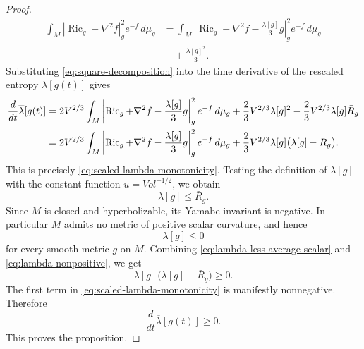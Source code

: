\documentclass{amsart}
\begin{document}
\begin{proof}
\begin{equation}
\label{eq:square-decomposition}
\begin{aligned}
        \int_M
        \left|
                \operatorname{Ric}_g+\nabla^2 f
        \right|_g^2
        e^{-f}\,d\mu_g
        &=
        \int_M
        \left|
                \operatorname{Ric}_g+\nabla^2 f
                -
                \frac{\lambda[g]}{3}g
        \right|_g^2
        e^{-f}\,d\mu_g        \\
        &\quad
        +
        \frac{\lambda[g]^2}{3}.
\end{aligned}
\end{equation}
Substituting \eqref{eq:square-decomposition} into the time derivative of the rescaled entropy $\overline{\lambda}[g(t)]$ gives
\begin{align}
        \frac{d}{dt}\overline{\lambda}[g(t)]
        &=
        2V^{2/3}
        \int_M
        \left|
                \operatorname{Ric}_g+\nabla^2 f
                -
                \frac{\lambda[g]}{3}g
        \right|_g^2
        e^{-f}\,d\mu_g
        +
        \frac{2}{3}V^{2/3}\lambda[g]^2
        -
        \frac{2}{3}V^{2/3}\lambda[g]\bar R_g \notag \\
        &=
        2V^{2/3}
        \int_M
        \left|
                \operatorname{Ric}_g+\nabla^2 f
                -
                \frac{\lambda[g]}{3}g
        \right|_g^2
        e^{-f}\,d\mu_g
        +
        \frac{2}{3}V^{2/3}
        \lambda[g]\bigl(\lambda[g]-\bar R_g\bigr).
\end{align}
This is precisely \eqref{eq:scaled-lambda-monotonicity}. Testing the definition of \(\lambda[g]\) with
the constant function \(u=Vol^{-1/2}\), we obtain
\begin{equation}
\label{eq:lambda-less-average-scalar}
        \lambda[g]\leq \bar R_g .
\end{equation}
Since \(M\) is closed and hyperbolizable, its Yamabe invariant is negative.
In particular \(M\) admits no metric of positive scalar curvature, and hence
\begin{equation}
\label{eq:lambda-nonpositive}
        \lambda[g]\leq 0
\end{equation}
for every smooth metric \(g\) on \(M\). Combining
\eqref{eq:lambda-less-average-scalar} and \eqref{eq:lambda-nonpositive},
we get
\[
        \lambda[g]\bigl(\lambda[g]-\bar R_g\bigr)\geq 0.
\]
The first term in \eqref{eq:scaled-lambda-monotonicity} is manifestly
nonnegative. Therefore
\[
        \frac{d}{dt}\overline{\lambda}[g(t)]\geq 0.
\]
This proves the proposition.
\end{proof}
\end{document}
